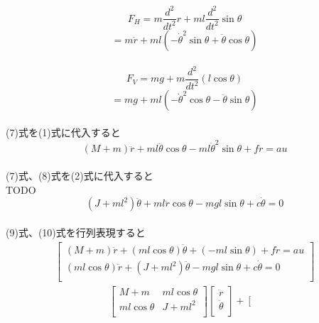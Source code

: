 \documentclass{jarticle}
\begin{document}
\begin{enumerate}
\begin{enumerate}
\begin{enumerate}
					\[F_{H} = m\frac{d^{2}}{dt^{2}}r + ml\frac{d^{2}}{dt^{2}}\sin{\theta}\]
					\begin{equation}
						    = m\ddot{r}+ml(-\dot{\theta}^{2}\sin{\theta}+\ddot{\theta}\cos{\theta})
					\end{equation}
					\\
					\[F_{V} = mg + m\frac{d^{2}}{dt^{2}}(l\cos{\theta})\]
					\begin{equation}
						= mg + ml(-\dot{\theta}^{2}\cos{\theta}-\ddot{\theta}\sin{\theta})
					\end{equation}
					\\
					(7)式を(1)式に代入すると\\
					\begin{equation}
						(M+m)\ddot{r} + ml\ddot{\theta}\cos{\theta}-ml\dot{\theta}^{2}\sin{\theta}+f\dot{r}=au
					\end{equation}
					\\
					(7)式、(8)式を(2)式に代入すると\\ TODO
					\begin{equation}
						(J + ml^{2})\ddot{\theta} + ml\ddot{r}\cos{\theta} - mgl\sin{\theta} + c\dot{\theta} = 0
					\end{equation}
					\\
					(9)式、(10)式を行列表現すると\\
					\begin{eqnarray}
						\left[
						\begin{array}{ccc}
							(M + m)\ddot{r} + (ml\cos{\theta})\ddot{\theta} + (-ml\sin{\theta}) + f\dot{r} = au \\
							(ml\cos{\theta})\ddot{r} + (J + ml^{2})\ddot{\theta} -mgl\sin{\theta} + c\dot{\theta} = 0\\
						\end{array}
						\right]
					\end{eqnarray}
					\begin{eqnarray}
						\left[
						\begin{array}{ccc}
							M + m & ml\cos{\theta} \\
							ml\cos{\theta} & J + ml^{2}\\
						\end{array}
						\right]
						\left[
						\begin{array}{ccc}
							\ddot{r} \\
							\ddot{\theta}\\
						\end{array}
						\right] +
						\left[
						\begin{array}{ccc}

\end{array}
\end{eqnarray}
\end{enumerate}
\end{enumerate}
\end{enumerate}
\end{document}
